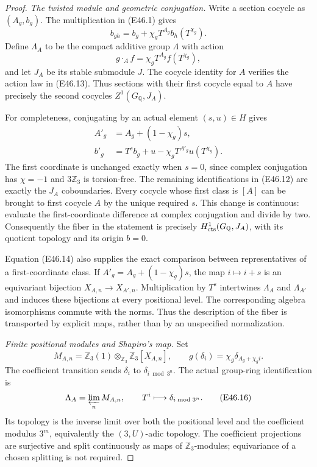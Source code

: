 \begin{proof}
\emph{The twisted module and geometric conjugation.}
Write a section cocycle as $(A_g,b_g)$. The multiplication
in (E46.1) gives
\[
 b_{gh}=b_g+\chi_gT^{A_g}b_h(T^{\chi_g}).
 \tag{E46.12}
\]
Define $\Lambda_A$ to be the compact additive group
$\Lambda$ with action
\[
                g\cdot_A f=\chi_gT^{A_g}f(T^{\chi_g}),
 \tag{E46.13}
\]
and let $J_A$ be its stable submodule $J$.
The cocycle identity for $A$ verifies the action law
in (E46.13). Thus sections with their first cocycle
equal to $A$ have precisely the second cocycles
$Z^1(G_{\mathbb Q},J_A)$.

For completeness, conjugating by an actual element
$(s,u)\in H$ gives
\[
 \begin{split}
 A'_g&=A_g+(1-\chi_g)s,\\
 b'_g&=T^s b_g+u-\chi_gT^{A'_g}u(T^{\chi_g}).
 \end{split}                                             \tag{E46.14}
\]
The first coordinate is unchanged exactly when
$s=0$, since complex conjugation has $\chi=-1$
and $3\mathbb Z_3$ is torsion-free. The remaining
identifications in (E46.12) are exactly the
$J_A$ coboundaries. Every cocycle whose first class
is $[A]$ can be brought to first cocycle $A$ by the
unique required $s$. This change is continuous:
evaluate the first-coordinate difference at complex
conjugation and divide by two. Consequently the
fiber in the statement is precisely
$H^1_{\rm cts}(G_{\mathbb Q},J_A)$, with its quotient
topology and its origin $b=0$.

Equation (E46.14) also supplies the exact comparison
between representatives of a first-coordinate class.
If $A'_g=A_g+(1-\chi_g)s$, the map
$i\mapsto i+s$ is an equivariant bijection
$X_{A,n}\to X_{A',n}$. Multiplication by $T^s$
intertwines $\Lambda_A$ and $\Lambda_{A'}$ and
induces these bijections at every positional level.
The corresponding algebra isomorphisms commute with
the norms. Thus the description of the fiber is
transported by explicit maps, rather than by an
unspecified normalization.

\emph{Finite positional modules and Shapiro's map.}
Set
\[
 M_{A,n}=\mathbb Z_3(1)\otimes_{\mathbb Z_3}
                   \mathbb Z_3[X_{A,n}],
 \qquad
       g(\delta_i)=\chi_g\delta_{A_g+\chi_gi}.
 \tag{E46.15}
\]
The coefficient transition sends $\delta_i$ to
$\delta_{i\bmod3^n}$. The actual group-ring
identification is
\[
 \Lambda_A=\varprojlim_n M_{A,n},
 \qquad
 T^i\longmapsto\delta_{i\bmod3^n}.                    \tag{E46.16}
\]
Its topology is the inverse limit over both the
positional level and the coefficient modulus $3^m$,
equivalently the $(3,U)$-adic topology. The coefficient
projections are surjective and split continuously
as maps of $\mathbb Z_3$-modules; equivariance of a
chosen splitting is not required.


\end{proof}
